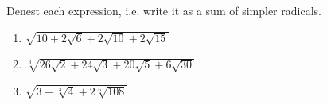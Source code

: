 Denest each expression, i.e. write it as a sum of simpler radicals.
\begin{enumerate}
\item[(a)] $\sqrt{10+2\sqrt6+2\sqrt{10}+2\sqrt{15}}$
\item[(b)] $\sqrt[3]{26\sqrt2+24\sqrt3+20\sqrt5+6\sqrt{30}}$
\item[(c)] $\sqrt{3+\sqrt[3]4+2\sqrt[6]{108}}$
\end{enumerate}
